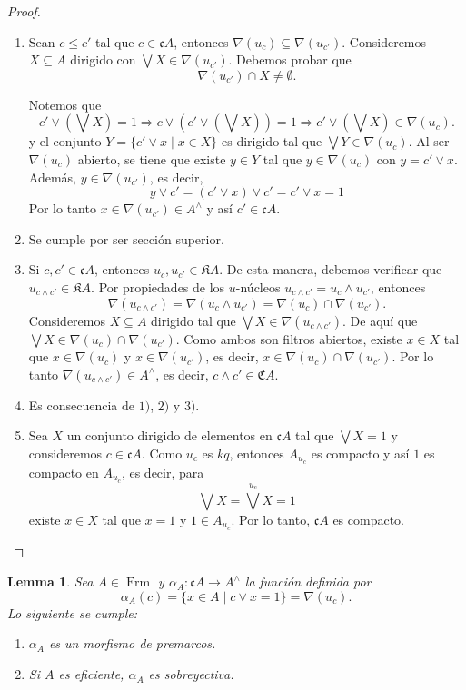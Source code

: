 \documentclass[11pt]{amsart}
\DeclareMathOperator{\Frm}{Frm}
\theoremstyle{plain}
\newtheorem{lem}[thm]{Lemma}
\theoremstyle{definition}
\begin{document}
\begin{proof}
    \begin{enumerate}
        \item Sean $c\leq c'$ tal que $c\in \mathfrak{c}A$, entonces $\nabla(u_c)\subseteq \nabla(u_{c'})$. Consideremos $X\subseteq A$ dirigido con $\bigvee X\in \nabla(u_{c'})$. Debemos probar que 
        \[
        \nabla(u_{c'})\cap X\neq \emptyset.
        \]
        
        Notemos que 
        \[
        c'\vee (\bigvee X)=1\Rightarrow c\vee (c'\vee (\bigvee X))=1\Rightarrow c'\vee (\bigvee X)\in \nabla(u_c). 
        \]
        y el conjunto $Y=\{c'\vee x\mid x\in X\}$ es dirigido tal que $\bigvee Y\in \nabla(u_c)$. Al ser $\nabla(u_c)$ abierto, se tiene que existe $y\in Y$ tal que $y\in \nabla(u_c)$ con $y=c'\vee x$. Además, $y\in \nabla(u_{c'})$, es decir,
        \[
        y\vee c'=(c'\vee x)\vee c'= c'\vee x=1
        \]
        Por lo tanto $x\in \nabla(u_{c'})\in A^\wedge$ y así $c'\in \mathfrak{c}A$.
        \item Se cumple por ser sección superior.
        \item Si $c, c'\in \mathfrak{c}A$, entonces $u_c, u_{c'}\in \mathfrak{K}A$. De esta manera, debemos verificar que $u_{c\wedge c'}\in \mathfrak{K}A$. Por propiedades de los $u$-núcleos $u_{c\wedge c'}=u_c\wedge u_{c'}$, entonces
        \[
            \nabla(u_{c\wedge c'})=\nabla(u_c\wedge u_{c'})=\nabla(u_c)\cap \nabla(u_{c'}).
        \]
        Consideremos $X\subseteq A$ dirigido tal que $\bigvee X\in \nabla(u_{c\wedge c'})$. De aquí que $\bigvee X\in \nabla(u_c)\cap \nabla(u_{c'})$. Como ambos son filtros abiertos, existe $x\in X$ tal que $x\in \nabla(u_c)$ y $x\in \nabla(u_{c'})$, es decir, $x\in \nabla(u_c)\cap \nabla(u_{c'})$. Por lo tanto $\nabla(u_{c\wedge c'})\in A^\wedge$, es decir, $c\wedge c'\in \mathfrak{C}A$.
        \item Es consecuencia de $1)$, $2)$ y $3)$.
        \item Sea $X$ un conjunto dirigido de elementos en $\mathfrak{c}A$ tal que $\bigvee X=1$ y consideremos $c\in \mathfrak{c}A$. Como $u_c$ es $kq$, entonces $A_{u_c}$ es compacto y así $1$ es compacto en $A_{u_c}$, es decir, para
        \[
        \bigvee X=\bigvee^{u_c}X=1
        \]
        existe $x\in X$ tal que $x=1$ y $1\in A_{u_c}$.  Por lo tanto, $\mathfrak{c}A$ es compacto.
    \end{enumerate}
\end{proof}

\begin{lem}\label{Lema2.8y2.9}
    Sea $A\in \Frm$ y $\alpha_A\colon \mathfrak{c}A\to A^\wedge$ la función definida por
    \[
    \alpha_A(c)=\{x\in A\mid c\vee x=1\}=\nabla(u_c).
    \]
    Lo siguiente se cumple:
    \begin{enumerate}
        \item $\alpha_A$ es un morfismo de premarcos.
        \item Si $A$ es eficiente, $\alpha_A$ es sobreyectiva.
    \end{enumerate}
\end{lem}
\end{document}

